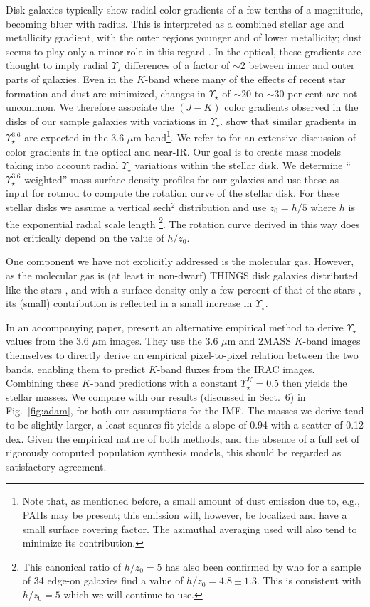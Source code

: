 \documentclass[usenatbib,usegraphicx,apjfonts,floatfix]{emulateapj}
\newcommand{\MLstar}{\ensuremath{\Upsilon_{\star}}}
\newcommand{\Ups}{\ensuremath{\Upsilon_{\star}^{3.6}}}
\begin{document}
Disk galaxies typically show radial color gradients of a few tenths of
a magnitude, becoming bluer with radius. This is interpreted as a
combined stellar age and metallicity gradient, with the outer regions
younger and of lower metallicity; dust seems to play only a minor role
in this regard \citep{dejong96}.  In the optical, these gradients are
thought to imply radial $\Upsilon_{\star}$ differences of a factor of
$\sim 2$ between inner and outer parts of galaxies.  Even in the
$K$-band where many of the effects of recent star formation and dust
are minimized, changes in $\Upsilon_{\star}$ of $\sim 20$ to $\sim 30$
per cent are not uncommon.  We therefore associate the $(J-K)$ color
gradients observed in the disks of our sample galaxies with variations
in $\Upsilon_{\star}$.  \citet{oh2007} show that similar gradients in
$\Ups$ are expected in the 3.6 $\mu$m band\footnote{Note that, as
  mentioned before, a small amount of dust emission due to, e.g., PAHs
  may be present; this emission will, however, be localized and have a
  small surface covering factor. The azimuthal averaging used will
  also tend to minimize its contribution.}.  We refer to \citet{dejong96} for
an extensive discussion of color gradients in the optical and near-IR. Our
goal is to create mass models taking into account radial
$\Upsilon_{\star}$ variations within the stellar disk.  We determine
``\Ups-weighted'' mass-surface density profiles for our galaxies and
use these as input for {\sc rotmod} to compute the rotation curve of
the stellar disk. For these stellar disks we assume a vertical
sech$^2$ distribution and use $z_0=h/5$ where $h$ is the exponential
radial scale length \citep{piet1,piet2}\footnote{This canonical ratio
  of $h/z_0 = 5$ has also been confirmed by \citet{kregel_hz} who for
  a sample of 34 edge-on galaxies find a value of $h/z_0 = 4.8 \pm
  1.3$. This is consistent with $h/z_0=5$ which we will continue to
  use.}. The rotation curve derived in this way does not critically
depend on the value of $h/z_0$.

One component we have not explicitly addressed is the molecular gas.
However, as the molecular gas is (at least in non-dwarf) THINGS disk
galaxies distributed like the stars \citep{adam}, and with a surface
density only a few percent of that of the stars \citep{portas}, its
(small) contribution is reflected in a small increase in
\MLstar.

In an accompanying paper, \citet{adam} present an alternative
empirical method to derive $\Upsilon_{\star}$ values from the 3.6
$\mu$m images.  They use the 3.6 $\mu$m and 2MASS $K$-band images
themselves to directly derive an empirical pixel-to-pixel relation
between the two bands, enabling them to predict $K$-band fluxes from
the IRAC images.  Combining these $K$-band predictions with a constant
$\Upsilon_{\star}^K = 0.5$ then yields the stellar masses.  We compare
with our results (discussed in Sect.~6) in Fig.~\ref{fig:adam}, for
both our assumptions for the IMF. The masses we derive tend to be
slightly larger, a least-squares fit yields a slope of 0.94 with a
scatter of 0.12 dex.  Given the empirical nature of both methods, and
the absence of a full set of rigorously computed population synthesis
models, this should be regarded as satisfactory agreement.
\end{document}
